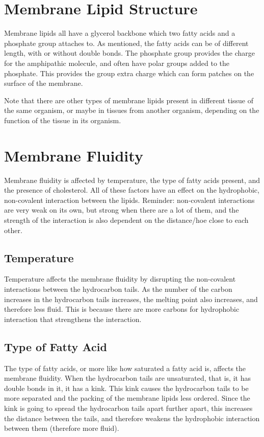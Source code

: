 \documentclass[a4paper, 12pt]{report}
\begin{document}
\section{Membrane Lipid Structure}

Membrane lipids all have a glycerol backbone which two fatty acids and a phosphate group attaches to.
As mentioned, the fatty acids can be of different length, with or without double bonds.
The phosphate group provides the charge for the amphipathic molecule, and often have polar groups added to the phosphate.
This provides the group extra charge which can form patches on the surface of the membrane.

Note that there are other types of membrane lipids present in different tissue of the same organism, or maybe in tissues from another organism, depending on the function of the tissue in its organism.

\section{Membrane Fluidity}

Membrane fluidity is affected by temperature, the type of fatty acids present, and the presence of cholesterol.
All of these factors have an effect on the hydrophobic, non-covalent interaction between the lipids.
Reminder: non-covalent interactions are very weak on its own, but strong when there are a lot of them, and the strength of the interaction is also dependent on the distance/hoe close to each other.

\subsection{Temperature}

Temperature affects the membrane fluidity by disrupting the non-covalent interactions between the hydrocarbon tails.
As the number of the carbon increases in the hydrocarbon tails increases, the melting point also increases, and therefore less fluid.
This is because there are more carbons for hydrophobic interaction that strengthens the interaction.

\subsection{Type of Fatty Acid}

The type of fatty acids, or more like how saturated a fatty acid is, affects the membrane fluidity.
When the hydrocarbon tails are unsaturated, that is, it has double bonds in it, it has a kink.
This kink causes the hydrocarbon tails to be more separated and the packing of the membrane lipids less ordered.
Since the kink is going to spread the hydrocarbon tails apart further apart, this increases the distance between the tails, and therefore weakens the hydrophobic interaction between them (therefore more fluid).
\end{document}
